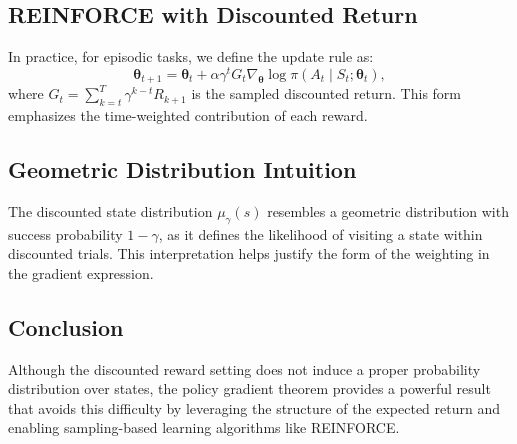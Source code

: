 \subsection{REINFORCE with Discounted Return}
In practice, for episodic tasks, we define the update rule as:
\[
\boldsymbol{\theta}_{t+1} = \boldsymbol{\theta}_t + \alpha \gamma^t G_t \nabla_{\boldsymbol{\theta}} \log \pi(A_t \mid S_t; \boldsymbol{\theta}_t),
\]
where \( G_t = \sum_{k=t}^{T} \gamma^{k-t} R_{k+1} \) is the sampled discounted return. This form emphasizes the time-weighted contribution of each reward.

\subsection{Geometric Distribution Intuition}
The discounted state distribution \( \mu_{\gamma}(s) \) resembles a geometric distribution with success probability \( 1 - \gamma \), as it defines the likelihood of visiting a state within discounted trials. This interpretation helps justify the form of the weighting in the gradient expression.

\subsection{Conclusion} 
Although the discounted reward setting does not induce a proper probability distribution over states, the policy gradient theorem provides a powerful result that avoids this difficulty by leveraging the structure of the expected return and enabling sampling-based learning algorithms like REINFORCE.
